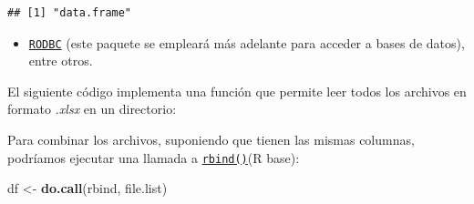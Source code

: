 \documentclass[
]{book}
\newenvironment{Shaded}{\begin{snugshade}}{\end{snugshade}}
\newcommand{\AttributeTok}[1]{\textcolor[rgb]{0.13,0.29,0.53}{#1}}
\newcommand{\CommentTok}[1]{\textcolor[rgb]{0.56,0.35,0.01}{\textit{#1}}}
\newcommand{\ControlFlowTok}[1]{\textcolor[rgb]{0.13,0.29,0.53}{\textbf{#1}}}
\newcommand{\FunctionTok}[1]{\textcolor[rgb]{0.13,0.29,0.53}{\textbf{#1}}}
\newcommand{\NormalTok}[1]{#1}
\newcommand{\OtherTok}[1]{\textcolor[rgb]{0.56,0.35,0.01}{#1}}
\newcommand{\SpecialCharTok}[1]{\textcolor[rgb]{0.81,0.36,0.00}{\textbf{#1}}}
\newcommand{\StringTok}[1]{\textcolor[rgb]{0.31,0.60,0.02}{#1}}
\providecommand{\tightlist}{%
  \setlength{\itemsep}{0pt}\setlength{\parskip}{0pt}}
\begin{document}
\begin{verbatim}
## [1] "data.frame"
\end{verbatim}

\begin{itemize}
\tightlist
\item
  \href{https://cran.r-project.org/web/packages/RODBC/index.html}{\texttt{RODBC}} (este paquete se empleará más adelante para acceder a bases de datos),
  entre otros.
\end{itemize}

El siguiente código implementa una función que permite leer todos
los archivos en formato \emph{.xlsx} en un directorio:

\begin{Shaded}
\end{Shaded}

Para combinar los archivos, suponiendo que tienen las mismas columnas, podríamos ejecutar una llamada a \href{https://www.rdocumentation.org/packages/base/versions/3.6.1/topics/rbind}{\texttt{rbind()}}(R base):

\begin{Shaded}
\begin{Highlighting}[]
\NormalTok{df }\OtherTok{\textless{}{-}} \FunctionTok{do.call}\NormalTok{(}\StringTok{\textquotesingle{}rbind\textquotesingle{}}\NormalTok{, file.list)}
\end{Highlighting}
\end{Shaded}
\end{document}

